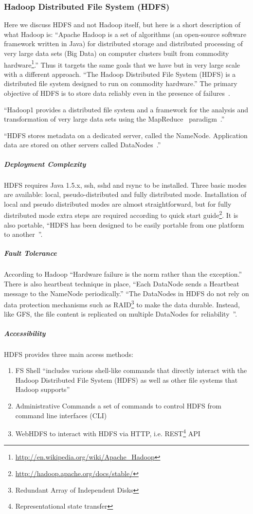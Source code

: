 \subsubsection{Hadoop Distributed File System (HDFS)}
Here we discuss HDFS and not Hadoop itself, but here is a short description of what Hadoop is:
``Apache Hadoop is a set of algorithms (an open-source software framework written in Java) 
for distributed storage and distributed processing of very large data sets (Big Data) 
on computer clusters built from commodity hardware\footnote{\url{http://en.wikipedia.org/wiki/Apache_Hadoop}}.''
Thus it targets the same goals that we have but in very large scale with a different approach.
``The Hadoop Distributed File System (HDFS) is a distributed file system designed to run on
commodity hardware.'' 
The primary objective of HDFS is to store data reliably even in the presence of failures~\cite[tp.~3]{HDFSDocuments}.

``Hadoop1 provides a distributed file system and a framework 
for the analysis and transformation of very large data sets 
using the MapReduce~\cite{DG04} paradigm~\cite{TheHDFS}.''

``HDFS stores metadata on a
dedicated server, called the NameNode. Application data are stored on
other servers called DataNodes~\cite{TheHDFS}.''


\subparagraph{Deployment Complexity}
HDFS requires Java 1.5.x, ssh, sshd and rsync to be installed. 
Three basic modes are available: local, pseudo-distributed and fully distributed mode. 
Installation of local and pseudo distributed modes are almost straightforward,
but for fully distributed mode extra steps are required according 
to quick start guide\footnote{\url{http://hadoop.apache.org/docs/stable/}}.
It is also portable, ``HDFS has been designed to be easily portable from one platform to another~\cite{TheHDFS}''.

\subparagraph{Fault Tolerance}
According to Hadoop ``Hardware failure is the norm rather than the exception.''
There is also heartbeat technique in place,
``Each DataNode sends a Heartbeat message to the NameNode periodically.''
``The DataNodes in HDFS do not rely on data protection mechanisms 
such as RAID\footnote{Redundant Array of Independent Disks} to make the data durable. Instead, like GFS, 
the file content is replicated on multiple DataNodes for reliability~\cite{TheHDFS}''.

\subparagraph{Accessibility}
HDFS provides three main access methods:
\begin{enumerate}
\item FS Shell ``includes various shell-like commands that directly interact with 
the Hadoop Distributed File System (HDFS) as well as other file systems that Hadoop supports''
\item Administrative Commands a set of commands to control HDFS from command line interfaces (CLI)
\item WebHDFS to interact with HDFS via HTTP, i.e. REST\footnote{Representational state transfer} API
\end{enumerate}

